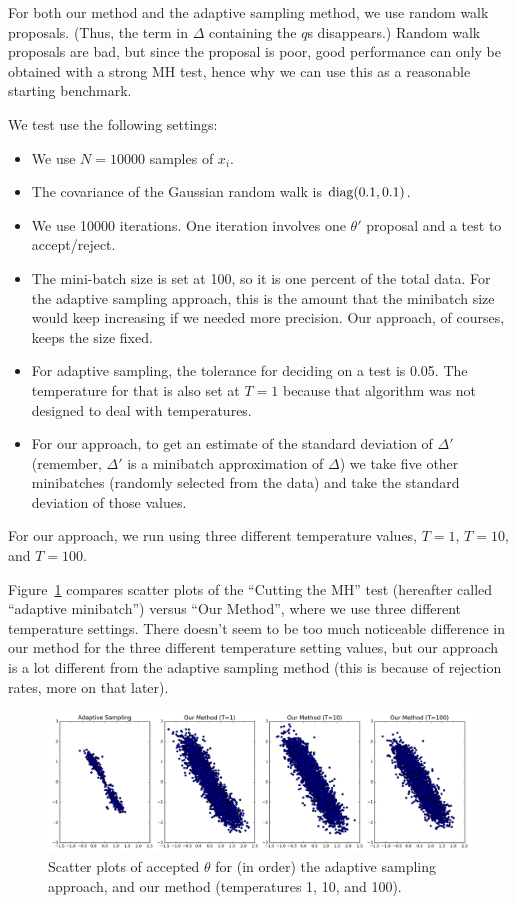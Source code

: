 \documentclass{article}
\begin{document}
For both our method and the adaptive sampling method, we use random walk proposals. (Thus, the term
in $\Delta$ containing the $q$s disappears.)  Random walk proposals are bad, but since the proposal
is poor, good performance can only be obtained with a strong MH test, hence why we can use this as a
reasonable starting benchmark.

We test use the following settings:

\begin{itemize}[noitemsep]
    \item We use $N=10000$ samples of $x_i$.
    \item The covariance of the Gaussian random walk is ${\rm diag}(0.1, 0.1)$.
    \item We use 10000 iterations. One iteration involves one $\theta'$ proposal and a test to
    accept/reject.
    \item The mini-batch size is set at 100, so it is one percent of the total data. For the
    adaptive sampling approach, this is the amount that the minibatch size would keep increasing if
    we needed more precision. Our approach, of courses, keeps the size fixed.
    \item For adaptive sampling, the tolerance for deciding on a test is 0.05. The temperature for
    that is also set at $T=1$ because that algorithm was not designed to deal with temperatures.
    \item For our approach, to get an estimate of the standard deviation of $\Delta'$ (remember,
    $\Delta'$ is a minibatch approximation of $\Delta$) we take five other minibatches (randomly
    selected from the data) and take the standard deviation of those values.
\end{itemize}

For our approach, we run using three different temperature values, $T=1$, $T=10$, and $T=100$.

Figure~\ref{fig:scatter} compares scatter plots of the ``Cutting the MH'' test (hereafter called
``adaptive minibatch'') versus ``Our Method'', where we use three different temperature settings.
There doesn't seem to be too much noticeable difference in our method for the three different
temperature setting values, but our approach is a lot different from the adaptive sampling method
(this is because of rejection rates, more on that later).

\begin{figure}[ht]
  \centering
  \includegraphics[width=1\linewidth]{scatter_v01}
  \caption{Scatter plots of accepted $\theta$ for (in order) the adaptive sampling approach, and our
  method (temperatures 1, 10, and 100).}
  \label{fig:scatter}
\end{figure}
\end{document}

